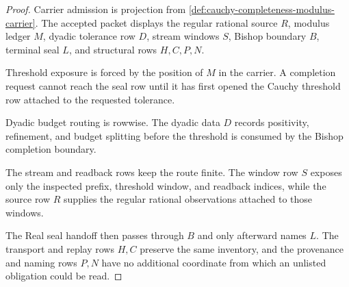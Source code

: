 \begin{proof}
Carrier admission is projection from \autoref{def:cauchy-completeness-modulus-carrier}. The accepted packet displays the regular rational source $R$, modulus ledger $M$, dyadic tolerance row $D$, stream windows $S$, Bishop boundary $B$, terminal seal $L$, and structural rows $H,C,P,N$.

Threshold exposure is forced by the position of $M$ in the carrier. A completion request cannot reach the seal row until it has first opened the Cauchy threshold row attached to the requested tolerance.

Dyadic budget routing is rowwise. The dyadic data $D$ records positivity, refinement, and budget splitting before the threshold is consumed by the Bishop completion boundary.

The stream and readback rows keep the route finite. The window row $S$ exposes only the inspected prefix, threshold window, and readback indices, while the source row $R$ supplies the regular rational observations attached to those windows.

The Real seal handoff then passes through $B$ and only afterward names $L$. The transport and replay rows $H,C$ preserve the same inventory, and the provenance and naming rows $P,N$ have no additional coordinate from which an unlisted obligation could be read.
\end{proof}

